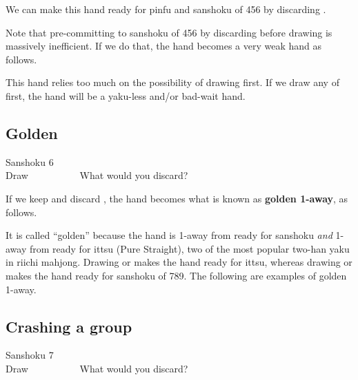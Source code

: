 We can make this hand ready for {\jap pinfu} and {\jap sanshoku} of 456 by discarding {\LARGE{}}. 

\bigskip
Note that pre-committing to {\jap sanshoku} of 456 by discarding {\LARGE{}} before drawing {\LARGE{}} is massively inefficient. If we do that, the hand becomes a very weak hand as follows. 
\bp
{}
\ep

\bigskip
This hand relies too much on the possibility of drawing {\LARGE{}} first. If we draw any of {\LARGE{}} first, the hand will be a {\jap yaku}-less and/or bad-wait hand.

\bigskip
\subsection{Golden}\label{sec:san6}
\begin{itembox}[r]{{\jap Sanshoku} 6}
\bp
{}~\\
\hfill\footnotesize{Draw~~~~~~~~~~}
\ep
\vspace{-17pt}What would you discard? \vspace{-5pt}
\end{itembox}

\bigskip
If we keep {\LARGE{}} and discard {\LARGE{}}, the hand becomes what is known as {\bf golden 1-away}, as follows.
\bp
{}
\ep {}

\bigskip
It is called ``golden'' because the hand is 1-away from ready for {\jap sanshoku} \emph{and} 1-away from ready for {\jap ittsu} (Pure Straight), two of the most popular two-{\jap han yaku} in riichi mahjong. 
Drawing {\LARGE{}} or {\LARGE{}} makes the hand ready for {\jap ittsu}, whereas drawing {\LARGE{}} or {\LARGE{}} makes the hand ready for {\jap sanshoku} of 789. The following are examples of golden 1-away.
\bp
{}\fa\fa\\
\ep


\bigskip
\subsection{Crashing a group}\label{sec:san7}
\begin{itembox}[r]{{\jap Sanshoku} 7}
\bp
{}~\\
\hfill\footnotesize{Draw~~~~~~~~~~}
\ep
\vspace{-15pt}What would you discard? \vspace{-5pt}
\end{itembox}


